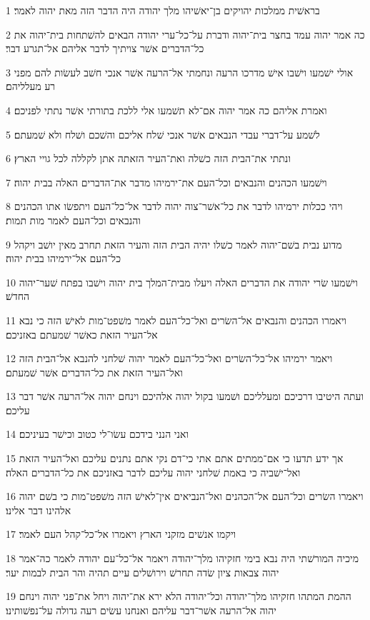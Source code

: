 \par 1 בראשׁית ממלכות יהויקים בן־יאשׁיהו מלך יהודה היה הדבר הזה מאת יהוה לאמר׃
\par 2 כה אמר יהוה עמד בחצר בית־יהוה ודברת על־כל־ערי יהודה הבאים להשׁתחות בית־יהוה את כל־הדברים אשׁר צויתיך לדבר אליהם אל־תגרע דבר׃
\par 3 אולי ישׁמעו וישׁבו אישׁ מדרכו הרעה ונחמתי אל־הרעה אשׁר אנכי חשׁב לעשׂות להם מפני רע מעלליהם׃
\par 4 ואמרת אליהם כה אמר יהוה אם־לא תשׁמעו אלי ללכת בתורתי אשׁר נתתי לפניכם׃
\par 5 לשׁמע על־דברי עבדי הנבאים אשׁר אנכי שׁלח אליכם והשׁכם ושׁלח ולא שׁמעתם׃
\par 6 ונתתי את־הבית הזה כשׁלה ואת־העיר הזאתה אתן לקללה לכל גויי הארץ׃
\par 7 וישׁמעו הכהנים והנבאים וכל־העם את־ירמיהו מדבר את־הדברים האלה בבית יהוה׃
\par 8 ויהי ככלות ירמיהו לדבר את כל־אשׁר־צוה יהוה לדבר אל־כל־העם ויתפשׂו אתו הכהנים והנבאים וכל־העם לאמר מות תמות׃
\par 9 מדוע נבית בשׁם־יהוה לאמר כשׁלו יהיה הבית הזה והעיר הזאת תחרב מאין יושׁב ויקהל כל־העם אל־ירמיהו בבית יהוה׃
\par 10 וישׁמעו שׂרי יהודה את הדברים האלה ויעלו מבית־המלך בית יהוה וישׁבו בפתח שׁער־יהוה החדשׁ׃
\par 11 ויאמרו הכהנים והנבאים אל־השׂרים ואל־כל־העם לאמר משׁפט־מות לאישׁ הזה כי נבא אל־העיר הזאת כאשׁר שׁמעתם באזניכם׃
\par 12 ויאמר ירמיהו אל־כל־השׂרים ואל־כל־העם לאמר יהוה שׁלחני להנבא אל־הבית הזה ואל־העיר הזאת את כל־הדברים אשׁר שׁמעתם׃
\par 13 ועתה היטיבו דרכיכם ומעלליכם ושׁמעו בקול יהוה אלהיכם וינחם יהוה אל־הרעה אשׁר דבר עליכם׃
\par 14 ואני הנני בידכם עשׂו־לי כטוב וכישׁר בעיניכם׃
\par 15 אך ידע תדעו כי אם־ממתים אתם אתי כי־דם נקי אתם נתנים עליכם ואל־העיר הזאת ואל־ישׁביה כי באמת שׁלחני יהוה עליכם לדבר באזניכם את כל־הדברים האלה׃
\par 16 ויאמרו השׂרים וכל־העם אל־הכהנים ואל־הנביאים אין־לאישׁ הזה משׁפט־מות כי בשׁם יהוה אלהינו דבר אלינו׃
\par 17 ויקמו אנשׁים מזקני הארץ ויאמרו אל־כל־קהל העם לאמר׃
\par 18 מיכיה המורשׁתי היה נבא בימי חזקיהו מלך־יהודה ויאמר אל־כל־עם יהודה לאמר כה־אמר יהוה צבאות ציון שׂדה תחרשׁ וירושׁלים עיים תהיה והר הבית לבמות יער׃
\par 19 ההמת המתהו חזקיהו מלך־יהודה וכל־יהודה הלא ירא את־יהוה ויחל את־פני יהוה וינחם יהוה אל־הרעה אשׁר־דבר עליהם ואנחנו עשׂים רעה גדולה על־נפשׁותינו׃
